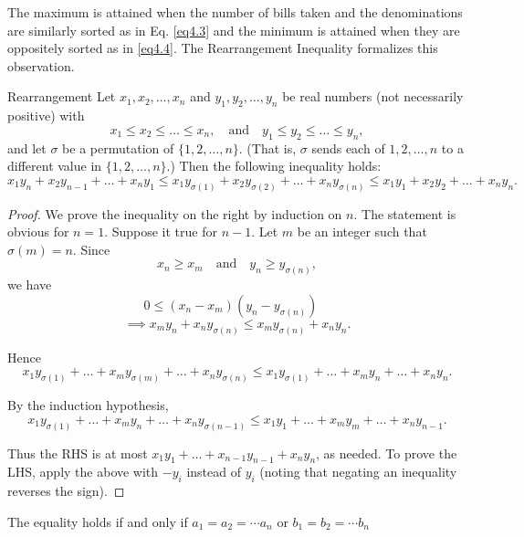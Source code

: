 The maximum is attained when the number of bills taken and the denominations are similarly sorted as
 in Eq. \ref{eq4.3} and the minimum is attained when they are oppositely sorted as in \ref{eq4.4}. The Rearrangement Inequality formalizes this observation.
\begin{theorem}{Rearrangement}
    Let \( x_1, x_2, \ldots, x_n \) and \( y_1, y_2, \ldots, y_n \) be real numbers (not necessarily positive) with
\[ x_1 \leq x_2 \leq \ldots \leq x_n, \quad \text{and} \quad y_1 \leq y_2 \leq \ldots \leq y_n, \]
and let \( \sigma \) be a permutation of \( \{1, 2, \ldots, n\} \). (That is, \( \sigma \) sends each of \( 1, 2, \ldots, n \) to a different value in \( \{1, 2, \ldots, n\} \).) Then the following inequality holds:
\[ x_1y_n + x_2y_{n-1} + \ldots + x_ny_1 \leq x_1y_{\sigma(1)} + x_2y_{\sigma(2)} + \ldots + x_ny_{\sigma(n)} \leq x_1y_1 + x_2y_2 + \ldots + x_ny_n. \]
\end{theorem}
\begin{proof}
    We prove the inequality on the right by induction on \( n \). The statement is obvious for \( n = 1 \). Suppose it true for \( n - 1 \). Let \( m \) be an integer such that \( \sigma(m) = n \). Since
\[ x_n \geq x_m \quad \text{and} \quad y_n \geq y_{\sigma(n)}, \]
we have
\[ 0 \leq (x_n - x_m)(y_n - y_{\sigma(n)}) \quad \]
\[\implies x_my_n + x_ny_{\sigma(n)} \leq x_my_{\sigma(n)} + x_ny_n. \]

Hence
\[ x_1y_{\sigma(1)} + \ldots + x_my_{\sigma(m)} + \ldots + x_ny_{\sigma(n)} \leq x_1y_{\sigma(1)} + \ldots + x_my_n + \ldots + x_ny_n. \]

By the induction hypothesis,
\[ x_1y_{\sigma(1)} + \ldots + x_my_n + \ldots + x_ny_{\sigma(n-1)} \leq x_1y_1 + \ldots + x_my_m + \ldots + x_ny_{n-1}. \]

Thus the RHS is at most \( x_1y_1 + \ldots + x_{n-1}y_{n-1} + x_ny_n \), as needed.
To prove the LHS, apply the above with \( -y_i \) instead of \( y_i \) (noting that negating an inequality reverses the sign).
\end{proof}
\begin{remark}
    The equality holds if and only if $a_1 = a_2 =\cdots a_n$ or $b_1 = b_2 =\cdots b_n$
\end{remark}
